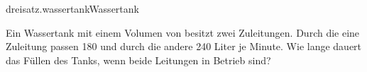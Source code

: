 \begin{exercise}{dreisatz.wassertank}{Wassertank}
  \ifproblem\problem\par
    Ein Wassertank mit einem Volumen von  besitzt zwei Zuleitungen.
    Durch die eine Zuleitung passen 180 und durch die andere 240 Liter je Minute.
    Wie lange dauert das Füllen des Tanks, wenn beide Leitungen in Betrieb
    sind?
  \fi
\end{exercise}
